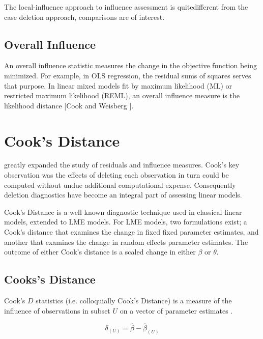 \documentclass[12pt, a4paper]{report}
\theoremstyle{plain}
\theoremstyle{definition}
\theoremstyle{remark}
\begin{document}
The local-influence approach to influence assessment is quitedifferent from the case deletion approach, comparisons are of
interest.



\subsection{Overall Influence}
An overall influence statistic measures the change in the objective function being minimized. For example, in
OLS regression, the residual sums of squares serves that purpose. In linear mixed models fit by
 maximum likelihood (ML) or  restricted maximum likelihood (REML), an overall influence measure is the  likelihood distance [Cook and Weisberg ].



\newpage
\section{Cook's Distance} %

\citet{cook77} greatly expanded the study of residuals and influence measures. Cook's key observation was the effects of deleting each observation in turn could be computed without undue additional computational expense. Consequently deletion diagnostics have become an integral part of assessing linear models.

Cook's Distance is a well known diagnostic technique used in classical linear models, extended to LME models.  For LME models, two formulations exist; a Cook's distance that examines the change in fixed fixed parameter estimates, and another that examines the change in random effects parameter estimates. The outcome of either Cook's distance is a scaled change in either $\beta$ or $\theta$.

\subsection{Cooks's Distance}
 Cook's $D$ statistics (i.e. colloquially Cook's Distance) is a measure of the influence of observations in subset $U$ on a vector of parameter estimates \citep{cook77}.

\[ \delta_{(U)} = \hat{\beta} - \hat{\beta}_{(U)}\]
\end{document}
